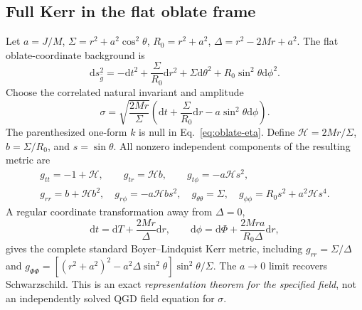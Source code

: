\documentclass[11pt,a4paper]{article}
\newcommand{\dd}{\mathrm d}
\begin{document}
\subsection{Full Kerr in the flat oblate frame}
Let $a=J/M$, $\Sigma=r^2+a^2\cos^2\theta$, $R_0=r^2+a^2$, $\Delta=r^2-2Mr+a^2$. The flat oblate-coordinate background is
\begin{equation}\label{eq:oblate-eta}
\dd s_{\bar g}^2=-\dd t^2+\frac\Sigma{R_0}\dd r^2
+\Sigma\dd\theta^2+R_0\sin^2\theta\dd\phi^2.
\end{equation}
Choose the correlated natural invariant and amplitude
\begin{equation}\label{eq:kerr-sigma}
\boxed{\sigma=\sqrt{\frac{2Mr}{\Sigma}}
\left(\dd t+\frac\Sigma{R_0}\dd r-a\sin^2\theta\dd\phi\right).}
\end{equation}
The parenthesized one-form $k$ is null in Eq.~\eqref{eq:oblate-eta}. Define $\mathcal H=2Mr/\Sigma$, $b=\Sigma/R_0$, and $s=\sin\theta$. All nonzero independent components of the resulting metric are
\begin{equation}\label{eq:kerr-components}
\begin{gathered}
 g_{tt}=-1+\mathcal H,\qquad g_{tr}=\mathcal H b,
 \qquad g_{t\phi}=-a\mathcal H s^2,\\
 g_{rr}=b+\mathcal H b^2,\quad
 g_{r\phi}=-a\mathcal H b s^2,\quad
 g_{\theta\theta}=\Sigma,\quad
 g_{\phi\phi}=R_0s^2+a^2\mathcal H s^4.
\end{gathered}
\end{equation}
A regular coordinate transformation away from $\Delta=0$,
\begin{equation}\label{eq:ks-to-bl}
\dd t=\dd T+\frac{2Mr}{\Delta}\dd r,
\qquad\dd\phi=\dd\Phi+\frac{2Mra}{R_0\Delta}\dd r,
\end{equation}
gives the complete standard Boyer--Lindquist Kerr metric, including $g_{rr}=\Sigma/\Delta$ and $g_{\Phi\Phi}=[(r^2+a^2)^2-a^2\Delta\sin^2\theta]\sin^2\theta/\Sigma$. The $a\to0$ limit recovers Schwarzschild. This is an exact \emph{representation theorem for the specified field}, not an independently solved QGD field equation for $\sigma$.
\end{document}
